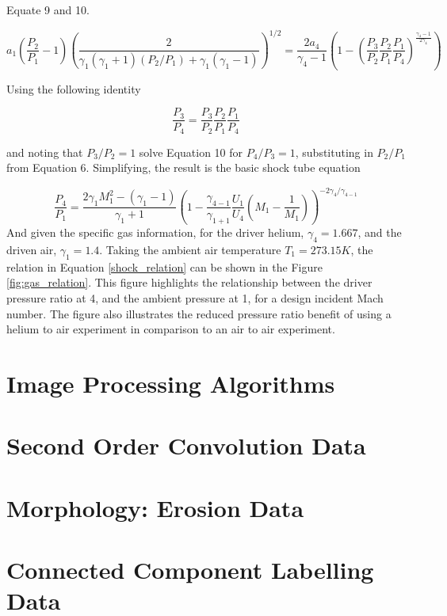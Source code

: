 Equate 9 and 10.

\begin{equation}
a_1\left(\frac{P_2}{P_1} - 1\right)\left(\frac{2}{\gamma_1(\gamma_1 + 1)(P_2/P_1) + \gamma_1(\gamma_1 - 1)}\right)^{1/2} = \frac{2a_4}{\gamma_4 - 1}\left(1 - \left(\frac{P_3}{P_2}\frac{P_2}{P_1}\frac{P_1}{P_4}\right)^{\frac{\gamma_4 - 1}{2\gamma_4}}\right)
\end{equation}

Using the following identity

\begin{equation}
\frac{P_3}{P_4}=\frac{P_3}{P_2}\frac{P_2}{P_1}\frac{P_1}{P_4}
\end{equation}

and noting that $P_3/P_2 = 1$ solve Equation 10 for $P_4/P_3 = 1$, substituting in $P_2/P_1$ from Equation 6. Simplifying, the result is the basic shock tube equation

\begin{equation} \label{shock_relation}
\frac{P_4}{P_1} = \frac{2\gamma_1M_1^2 - (\gamma_1 - 1)}{\gamma_1 + 1}\left(1 - \frac{\gamma_{4-1}}{\gamma_{1+1}}\frac{U_1}{U_4}\left(M_1 - \frac{1}{M_1}\right)\right)^{-2\gamma_4/\gamma_{4-1}}
\end{equation}
And given the specific gas information, for the driver helium, $\gamma_4 = 1.667$, and the driven air, $\gamma_1 = 1.4$. Taking the ambient air temperature $T_1 = 273.15K$, the relation in Equation \ref{shock_relation} can be shown in the Figure \ref{fig:gas_relation}. This figure highlights the relationship between the driver pressure ratio at 4, and the ambient pressure at 1, for a design incident Mach number. The figure also illustrates the reduced pressure ratio benefit of using a helium to air experiment in comparison to an air to air experiment. 

\section{Image Processing Algorithms} \label{app:code}

\section{Second Order Convolution Data} \label{app:hessian}

\section{Morphology: Erosion Data} \label{app:erosion}

\section{Connected Component Labelling Data} \label{app:component}	


